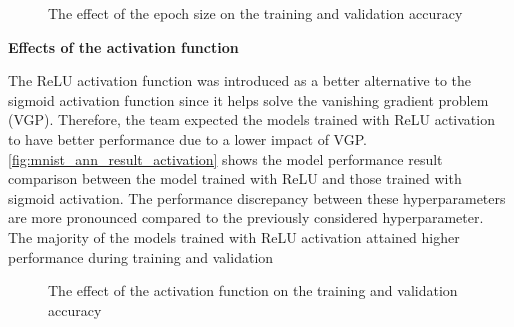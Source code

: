 \documentclass[a4paper]{article}
\begin{document}
\begin{figure} [h!]
    \caption{The effect of the epoch size on the training and validation accuracy} 
    \label{fig:mnist_ann_result_epoch}
\end{figure}

\textbf{Effects of the activation function}

The ReLU activation function was introduced as a better alternative to the sigmoid activation function since it helps solve the vanishing gradient problem (VGP). Therefore, the team expected the models trained with ReLU activation to have better performance due to a lower impact of VGP. \autoref{fig:mnist_ann_result_activation} shows the model performance result comparison between the model trained with ReLU and those trained with sigmoid activation. The performance discrepancy between these hyperparameters are more pronounced compared to the previously considered hyperparameter. The majority of the models trained with ReLU activation attained higher performance during training and validation

\begin{figure} [h!]
    \caption{The effect of the activation function on the training and validation accuracy} 
    \label{fig:mnist_ann_result_activation}
\end{figure}
\end{document}
